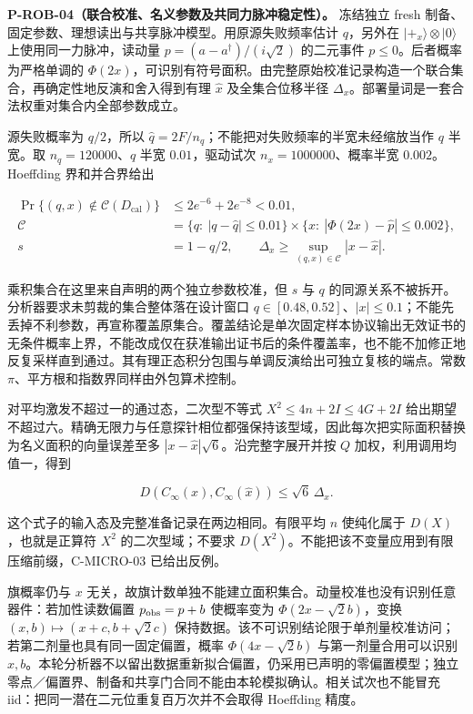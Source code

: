 \documentclass[
  11pt,
  oneside]{book}
\begin{document}
\textbf{P-ROB-04（联合校准、名义参数及共同力脉冲稳定性）。} 冻结独立
fresh 制备、固定参数、理想读出与共享脉冲模型。用原源失败频率估计
\(q\)，另外在 \(|+_x\rangle\otimes|0\rangle\) 上使用同一力脉冲，读动量
\(p=(a-a^\dagger)/(i\sqrt2)\) 的二元事件 \(p\le0\)。后者概率为严格单调的
\(\Phi(2x)\)，可识别有符号面积。由完整原始校准记录构造一个联合集合，再确定性地反演和舍入得到有理
\(\widehat x\) 及全集合位移半径
\(\Delta_x\)。部署量词是一套合法权重对集合内全部参数成立。

源失败概率为 \(q/2\)，所以
\(\widehat q=2F/n_q\)；不能把对失败频率的半宽未经缩放当作 \(q\) 半宽。取
\(n_q=120000\)、\(q\) 半宽 \(0.01\)，驱动试次 \(n_x=1000000\)、概率半宽
\(0.002\)。Hoeffding 界和并合界给出

\[
\begin{aligned}
\Pr\{(q,x)\notin\mathcal C(D_{\mathrm{cal}})\}
&\le 2e^{-6}+2e^{-8}<0.01,\\
\mathcal C&=\{q:\ |q-\widehat q|\le0.01\}
\times\{x:\ |\Phi(2x)-\widehat p|\le0.002\},\\
s&=1-q/2,\qquad
\Delta_x\ge\sup_{(q,x)\in\mathcal C}|x-\widehat x|.
\end{aligned}
\]

乘积集合在这里来自声明的两个独立参数校准，但 \(s\) 与 \(q\)
的同源关系不被拆开。分析器要求未剪裁的集合整体落在设计窗口
\(q\in[0.48,0.52]\)、\(|x|\le0.1\)；不能先丢掉不利参数，再宣称覆盖原集合。覆盖结论是单次固定样本协议输出无效证书的无条件概率上界，不能改成仅在获准输出证书后的条件覆盖率，也不能不加修正地反复采样直到通过。其有理正态积分包围与单调反演给出可独立复核的端点。常数
\(\pi\)、平方根和指数界同样由外包算术控制。

对平均激发不超过一的通过态，二次型不等式 \(X^2\le4n+2I\le4G+2I\)
给出期望不超过六。精确无限力与任意探针相位都强保持该型域，因此每次把实际面积替换为名义面积的向量误差至多
\(|x-\widehat x|\sqrt6\)。沿完整字展开并按 \(Q\)
加权，利用调用均值一，得到

\[
D(C_\infty(x),C_\infty(\widehat x))
\le\sqrt6\,\Delta_x.
\]

这个式子的输入态及完整准备记录在两边相同。有限平均 \(n\) 使纯化属于
\(D(X)\)，也就是正算符 \(X^2\) 的二次型域；不要求
\(D(X^2)\)。不能把该不变量应用到有限压缩前缀，C-MICRO-03 已给出反例。

旗概率仍与 \(x\)
无关，故旗计数单独不能建立面积集合。动量校准也没有识别任意器件：若加性读数偏置
\(p_{\rm obs}=p+b\) 使概率变为 \(\Phi(2x-\sqrt2b)\)，变换
\((x,b)\mapsto(x+c,b+\sqrt2c)\)
保持数据。该不可识别结论限于单剂量校准访问；若第二剂量也具有同一固定偏置，概率
\(\Phi(4x-\sqrt2b)\) 与第一剂量合用可以识别
\(x,b\)。本轮分析器不以留出数据重新拟合偏置，仍采用已声明的零偏置模型；独立零点／偏置界、制备和共享门合同不能由本轮模拟确认。相关试次也不能冒充
iid：把同一潜在二元位重复百万次并不会取得 Hoeffding 精度。
\end{document}
